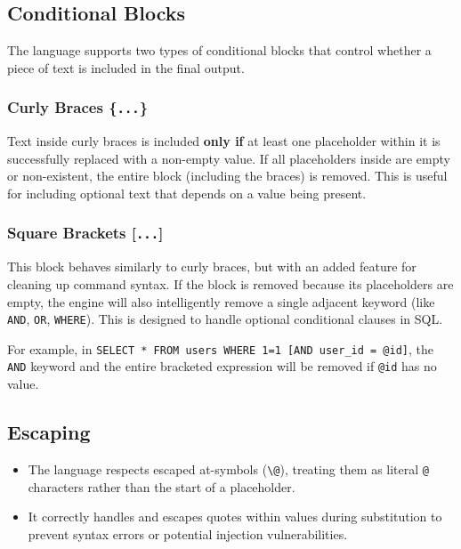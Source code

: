 \subsection{Conditional Blocks}

The language supports two types of conditional blocks that control whether a piece of text is included in the final output.

\subsubsection{Curly Braces \{\texttt{...}\}}

Text inside curly braces is included \textbf{only if} at least one placeholder within it is successfully replaced with a non-empty value. If all placeholders inside are empty or non-existent, the entire block (including the braces) is removed. This is useful for including optional text that depends on a value being present.

\subsubsection{Square Brackets [\texttt{...}]}

This block behaves similarly to curly braces, but with an added feature for cleaning up command syntax. If the block is removed because its placeholders are empty, the engine will also intelligently remove a single adjacent keyword (like \texttt{AND}, \texttt{OR}, \texttt{WHERE}). This is designed to handle optional conditional clauses in SQL.

For example, in \texttt{SELECT * FROM users WHERE 1=1 [AND user\_id = @id]}, the \texttt{AND} keyword and the entire bracketed expression will be removed if \texttt{@id} has no value.

\subsection{Escaping}

\begin{itemize}
\item The language respects escaped at-symbols (\texttt{\textbackslash @}), treating them as literal \texttt{@} characters rather than the start of a placeholder.
\item It correctly handles and escapes quotes within values during substitution to prevent syntax errors or potential injection vulnerabilities.
\end{itemize}


